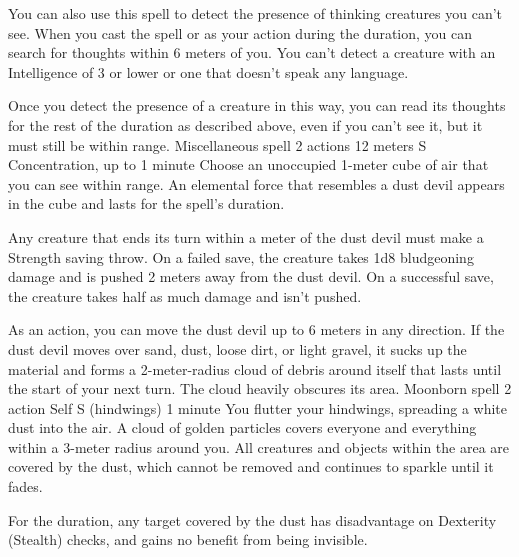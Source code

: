     You can also use this spell to detect the presence of thinking creatures you can't see.
    When you cast the spell or as your action during the duration, you can search for thoughts within 6 meters of you.
    You can't detect a creature with an Intelligence of 3 or lower or one that doesn't speak any language.

    Once you detect the presence of a creature in this way, you can read its thoughts for the rest of the duration as described above, even if you can't see it, but it must still be within range.
    {Miscellaneous spell}
    {2 actions}
    {12 meters}
    {S}
    {Concentration, up to 1 minute}
    Choose an unoccupied 1-meter cube of air that you can see within range.
    An elemental force that resembles a dust devil appears in the cube and lasts for the spell's duration.

    Any creature that ends its turn within a meter of the dust devil must make a Strength saving throw.
    On a failed save, the creature takes 1d8 bludgeoning damage and is pushed 2 meters away from the dust devil.
    On a successful save, the creature takes half as much damage and isn't pushed.

    As an action, you can move the dust devil up to 6 meters in any direction.
    If the dust devil moves over sand, dust, loose dirt, or light gravel, it sucks up the material and forms a 2-meter-radius cloud of debris around itself that lasts until the start of your next turn.
    The cloud heavily obscures its area.
    {Moonborn spell}
    {2 action}
    {Self}
    {S (hindwings)}
    {1 minute}
    You flutter your hindwings, spreading a white dust into the air.
    A cloud of golden particles covers everyone and everything within a 3-meter radius around you.
    All creatures and objects within the area are covered by the dust, which cannot be removed and continues to sparkle until it fades.

    For the duration, any target covered by the dust has disadvantage on Dexterity (Stealth) checks, and gains no benefit from being invisible.

